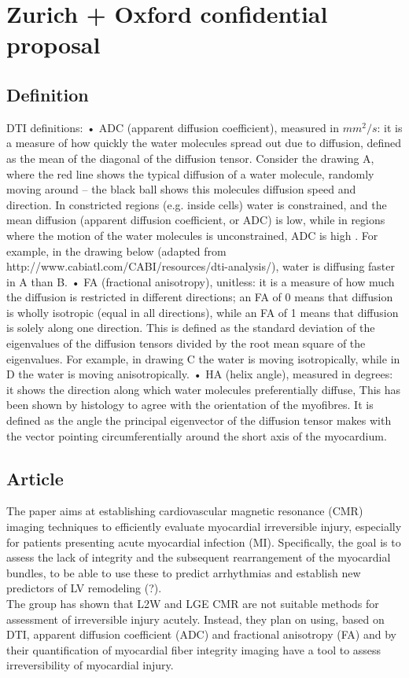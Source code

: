 \section{Zurich + Oxford confidential proposal}

\subsection{Definition}

DTI definitions:
• ADC (apparent diffusion coefficient), measured in $mm^2/s$: it is a measure of how quickly the water molecules spread out
due to diffusion, defined as the mean of the diagonal of the diffusion tensor. Consider the drawing A, where the red line shows the typical diffusion of a water molecule, randomly moving around – the black ball shows this molecules diffusion speed and direction. In constricted regions (e.g. inside cells) water is constrained, and the mean diffusion (apparent diffusion coefficient, or ADC) is low, while in regions where the motion of the water molecules is unconstrained, ADC is high . For example, in the drawing below (adapted from http://www.cabiatl.com/CABI/resources/dti-analysis/), water is diffusing faster in A than B.
• FA (fractional anisotropy), unitless: it is a measure of how much the diffusion is restricted in different directions; an FA of 0 means that diffusion is wholly isotropic (equal in all directions), while an FA of 1 means that diffusion is solely along one direction. This is defined as the standard deviation of the eigenvalues of the diffusion tensors divided by the root mean square of the eigenvalues. For example, in drawing C the water is moving isotropically, while
in D the water is moving anisotropically.
• HA (helix angle), measured in degrees: it shows the direction along which water molecules preferentially diffuse, This has been shown by histology to agree with the orientation of the myofibres. It is defined as the angle the principal eigenvector of the diffusion tensor makes with the vector pointing circumferentially around the short axis of the myocardium.


\subsection{Article}

The paper aims at establishing cardiovascular magnetic resonance (CMR) imaging techniques to efficiently evaluate myocardial irreversible injury, especially for patients presenting acute myocardial infection (MI).
Specifically, the goal is to assess the lack of integrity and the subsequent rearrangement of the myocardial bundles, to be able to use these to predict arrhythmias and establish new predictors of LV remodeling (?).\\
The group has shown that L2W and LGE CMR are not suitable methods for assessment of irreversible injury acutely. Instead, they plan on using, based on DTI, apparent diffusion coefficient (ADC) and fractional anisotropy (FA) and by their quantification of myocardial fiber integrity imaging have a tool to assess irreversibility of myocardial injury.\\

